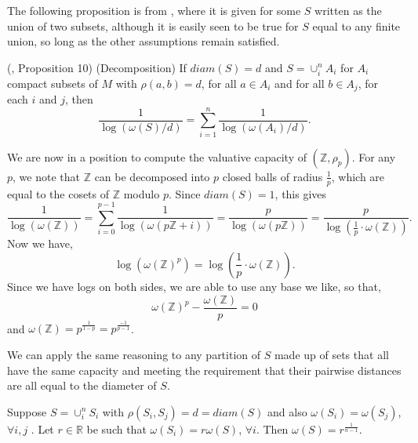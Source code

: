 The following proposition is from \cite{kj}, where it is given for some $S$  written as the union of two subsets, although it is easily seen to be true for $S$ equal to any finite union, so long as the other assumptions remain satisfied.\\  

\begin{proposition}
	(\cite{kj}, Proposition 10) (Decomposition) If  $diam(S)=d$ and $S=\cup_i^n A_i$ for $A_i$ compact subsets of $M$ with $\rho(a, b)=d$, for all $a \in A_i$ and for all $b \in A_j$, for each $i$ and $j$, then \[\frac{1}{\log(\omega(S)/d) } = \sum_{i=1}^n \frac{1}{\log(\omega(A_i)/d)}.\] 
\end{proposition}


\begin{example}
We are now in a position to compute the valuative capacity of $(\mathbb{Z}, \rho_p)$. For any $p$, we note that $\mathbb{Z}$ can be decomposed into $p$ closed balls of radius $\frac{1}{p}$, which are equal to the cosets of $\mathbb{Z}$ modulo $p$. Since $diam(S)=1$, this gives 
\[\frac{1}{\log(\omega(\mathbb{Z}))} = \sum_{i=0}^{p-1} \frac{1}{\log(\omega(p\mathbb{Z} +i))} = \frac{p}{\log(\omega(p\mathbb{Z}))} = \frac{p}{\log(\frac{1}{p} \cdot \omega(\mathbb{Z}))}.\]
Now we have,
\[\log(\omega(\mathbb{Z})^p) = \log(\frac{1}{p} \cdot\omega(\mathbb{Z})).\]
Since we have logs on both sides, we are able to use any base we like, so that,
\[\omega(\mathbb{Z})^p - \frac{\omega(\mathbb{Z})}{p} = 0 \]
and $\omega(\mathbb{Z})= p^{\frac{1}{1-p}}=p^{\frac{-1}{p-1}}$.
\end{example}

We can apply the same reasoning to any partition of $S$ made up of sets that all have the same capacity and meeting the requirement that their pairwise distances are all equal to the diameter of $S$.\\

\begin{corollary}
\label{semiregular}
	Suppose $S = \cup_i^n S_i$ with $\rho(S_i, S_j)=d=diam(S)$ and also $\omega(S_i)=\omega(S_j)$, $\forall i,j$ .  Let $r \in \mathbb{R}$ be such that $\omega(S_i)=r\omega(S)$, $\forall i$. Then $\omega(S) = r^{\frac{1}{n-1}}$. 
\end{corollary}

